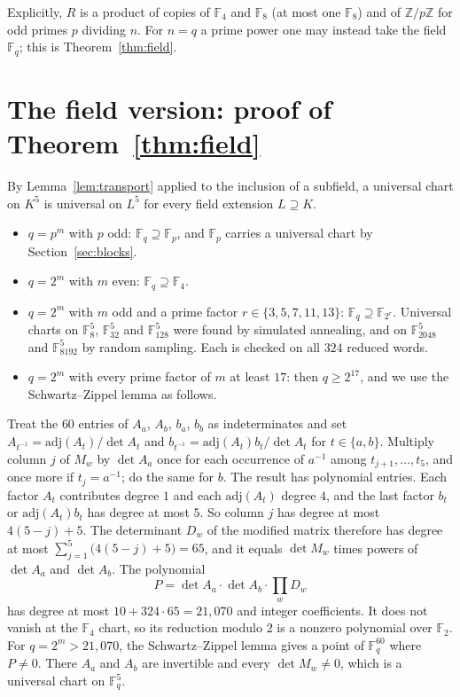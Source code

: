 \documentclass[11pt]{article}
\theoremstyle{definition}
\theoremstyle{remark}
\newcommand{\F}{\mathbb{F}}
\newcommand{\Z}{\mathbb{Z}}
\begin{document}
Explicitly, $R$ is a product of copies of $\F_4$ and $\F_8$ (at most one
$\F_8$) and of $\Z/p\Z$ for odd primes $p$ dividing $n$. For $n=q$ a prime
power one may instead take the field $\F_q$; this is
Theorem~\ref{thm:field}.

\section{The field version: proof of Theorem~\ref{thm:field}}\label{sec:field}

By Lemma~\ref{lem:transport} applied to the inclusion of a subfield, a
universal chart on $K^5$ is universal on $L^5$ for every field extension
$L\supseteq K$.

\begin{itemize}
\item $q=p^m$ with $p$ odd: $\F_q\supseteq\F_p$, and $\F_p$ carries a universal chart
by Section~\ref{sec:blocks}.
\item $q=2^m$ with $m$ even: $\F_q\supseteq\F_4$.
\item $q=2^m$ with $m$ odd and a prime factor $r\in\{3,5,7,11,13\}$:
$\F_q\supseteq\F_{2^r}$. Universal charts on $\F_8^5$, $\F_{32}^5$ and
$\F_{128}^5$ were found by simulated annealing, and on $\F_{2048}^5$ and
$\F_{8192}^5$ by random sampling. Each is checked on all $324$ reduced words.
\item $q=2^m$ with every prime factor of $m$ at least $17$: then
$q\ge 2^{17}$, and we use the Schwartz--Zippel lemma as follows.
\end{itemize}

Treat the $60$ entries of $A_a$, $A_b$, $b_a$, $b_b$ as indeterminates and
set $A_{t^{-1}}=\mathrm{adj}(A_t)/\det A_t$ and
$b_{t^{-1}}=\mathrm{adj}(A_t)b_t/\det A_t$ for $t\in\{a,b\}$. Multiply column $j$
of $M_w$ by $\det A_a$ once for each occurrence of $a^{-1}$ among
$t_{j+1},\dots,t_5$, and once more if $t_j=a^{-1}$; do the same for $b$. The
result has polynomial entries. Each factor $A_t$ contributes degree $1$ and
each $\mathrm{adj}(A_t)$ degree $4$, and the last factor $b_t$ or
$\mathrm{adj}(A_t)b_t$ has degree at most $5$. So column $j$ has degree at most
$4(5-j)+5$. The determinant $D_w$ of the modified matrix therefore has degree
at most $\sum_{j=1}^5\bigl(4(5-j)+5\bigr)=65$, and it equals $\det M_w$ times
powers of $\det A_a$ and $\det A_b$. The polynomial
\[
  P=\det A_a\cdot\det A_b\cdot\prod_{w}D_w
\]
has degree at most $10+324\cdot 65=21{,}070$ and integer coefficients. It does
not vanish at the $\F_4$ chart, so its reduction modulo $2$ is a nonzero
polynomial over $\F_2$. For $q=2^m>21{,}070$, the Schwartz--Zippel lemma gives
a point of $\F_q^{60}$ where $P\ne 0$. There $A_a$ and $A_b$ are invertible and
every $\det M_w\ne 0$, which is a universal chart on $\F_q^5$.
\end{document}
